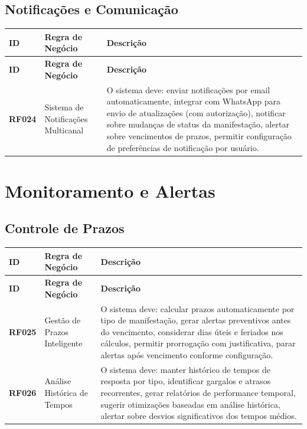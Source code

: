 \documentclass[12pt,a4paper]{article}
\newcommand{\rf}[1]{\textbf{\color{primaryblue}RF#1}}
\begin{document}
\subsection{Notificações e Comunicação}

\begin{longtable}{|p{2cm}|p{5cm}|p{8cm}|}
\hline
\textbf{ID} & \textbf{Regra de Negócio} & \textbf{Descrição} \\
\hline
\endfirsthead
\hline
\textbf{ID} & \textbf{Regra de Negócio} & \textbf{Descrição} \\
\hline
\endhead

\rf{024} & Sistema de Notificações Multicanal & O sistema deve: enviar notificações por email automaticamente, integrar com WhatsApp para envio de atualizações (com autorização), notificar sobre mudanças de status da manifestação, alertar sobre vencimentos de prazos, permitir configuração de preferências de notificação por usuário. \\
\hline

\end{longtable}

\section{Monitoramento e Alertas}

\subsection{Controle de Prazos}

\begin{longtable}{|p{2cm}|p{5cm}|p{8cm}|}
\hline
\textbf{ID} & \textbf{Regra de Negócio} & \textbf{Descrição} \\
\hline
\endfirsthead
\hline
\textbf{ID} & \textbf{Regra de Negócio} & \textbf{Descrição} \\
\hline
\endhead

\rf{025} & Gestão de Prazos Inteligente & O sistema deve: calcular prazos automaticamente por tipo de manifestação, gerar alertas preventivos antes do vencimento, considerar dias úteis e feriados nos cálculos, permitir prorrogação com justificativa, parar alertas após vencimento conforme configuração. \\
\hline

\rf{026} & Análise Histórica de Tempos & O sistema deve: manter histórico de tempos de resposta por tipo, identificar gargalos e atrasos recorrentes, gerar relatórios de performance temporal, sugerir otimizações baseadas em análise histórica, alertar sobre desvios significativos dos tempos médios. \\
\hline

\end{longtable}
\end{document}
